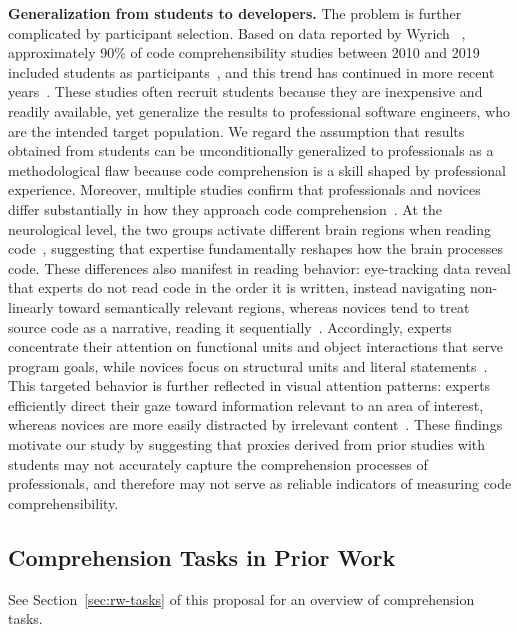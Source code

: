 \textbf{Generalization from students to developers.}
The problem is further complicated by participant selection. Based on data reported by Wyrich \etal~\cite{Wyrich:ACS23}, approximately 90\% of code comprehensibility studies between 2010 and 2019 included students as participants~\cite{S4, scalabrino2017automatically, chen2017evaluating, Fakhoury:2018ICPC, Scalabrino:TSE19}, and this trend has continued in more recent years~\cite{Nielebock:ESE2019, Peitek:ICSE2021, Ribeiro:ESE23, Sampaio:ICCQ2024, Karas:TSE2024, Abdelsalam:ESE2026}. These studies often recruit students because they are inexpensive and readily available, yet generalize the results to professional software engineers, who are the intended target population.
We regard the assumption that results obtained from students can be unconditionally generalized to professionals as a methodological flaw because code comprehension is a skill shaped by professional experience.
Moreover, multiple studies confirm that professionals and novices differ substantially in how they approach code comprehension~\cite{Aljehane:HCI2023, novicesVSprof2:ESE2002, NovicesVSprof1:BIBE2016, 33-8}. At the neurological level, the two groups activate different brain regions when reading code~\cite{NovicesVSprof1:BIBE2016}, suggesting that expertise fundamentally reshapes how the brain processes code. 
These differences also manifest in reading behavior: eye-tracking data reveal that experts do not read code in the order it is written, instead navigating non-linearly toward semantically relevant regions, whereas novices tend to treat source code as a narrative, reading it sequentially~\cite{33-8}. Accordingly, experts concentrate their attention on functional units and object interactions that serve program goals, while novices focus on structural units and literal statements~\cite{novicesVSprof2:ESE2002}. 
This targeted behavior is further reflected in visual attention patterns: experts efficiently direct their gaze toward information relevant to an area of interest, whereas novices are more easily distracted by irrelevant content~\cite{Aljehane:HCI2023, 33-8}.
These findings motivate our study by suggesting that proxies derived from prior studies with students may not accurately capture the comprehension processes of professionals, and therefore may not serve as reliable indicators of measuring code comprehensibility.



\subsection{Comprehension Tasks in Prior Work}
See Section~\ref{sec:rw-tasks} of this proposal for an overview of comprehension tasks.

